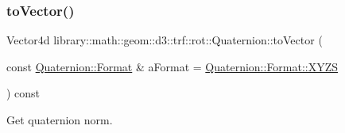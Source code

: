 \subsubsection{\texorpdfstring{to\+Vector()}{toVector()}}
{\footnotesize\ttfamily Vector4d library\+::math\+::geom\+::d3\+::trf\+::rot\+::\+Quaternion\+::to\+Vector (\begin{DoxyParamCaption}\item[{const \hyperlink{classlibrary_1_1math_1_1geom_1_1d3_1_1trf_1_1rot_1_1_quaternion_aa86c54f6157891b2f1a517c672d6deec}{Quaternion\+::\+Format} \&}]{a\+Format = {\ttfamily \hyperlink{classlibrary_1_1math_1_1geom_1_1d3_1_1trf_1_1rot_1_1_quaternion_aa86c54f6157891b2f1a517c672d6deeca11c51ecd5dc6f86ba3c1ae79e21482f5}{Quaternion\+::\+Format\+::\+X\+Y\+ZS}} }\end{DoxyParamCaption}) const}



Get quaternion norm. 


